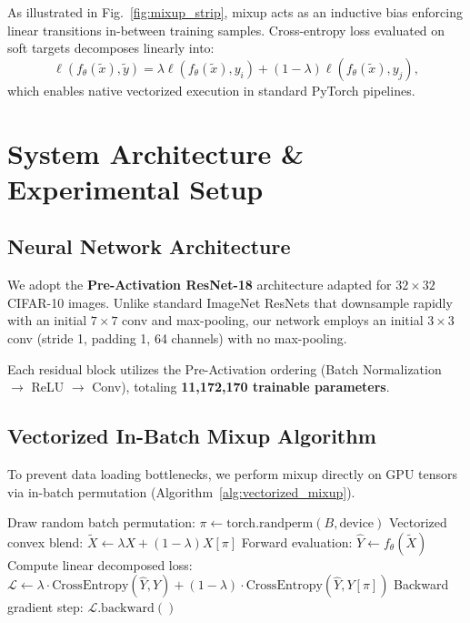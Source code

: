 \documentclass[conference]{IEEEtran}
\begin{document}
As illustrated in Fig.~\ref{fig:mixup_strip}, mixup acts as an inductive bias enforcing linear transitions in-between training samples. Cross-entropy loss evaluated on soft targets decomposes linearly into:
\begin{equation}
\ell(f_\theta(\tilde{x}), \tilde{y}) = \lambda \ell(f_\theta(\tilde{x}), y_i) + (1-\lambda) \ell(f_\theta(\tilde{x}), y_j),
\end{equation}
which enables native vectorized execution in standard PyTorch pipelines.

\section{System Architecture \& Experimental Setup}

\subsection{Neural Network Architecture}
We adopt the \textbf{Pre-Activation ResNet-18} architecture adapted for $32 \times 32$ CIFAR-10 images. Unlike standard ImageNet ResNets that downsample rapidly with an initial $7 \times 7$ conv and max-pooling, our network employs an initial $3 \times 3$ conv (stride 1, padding 1, 64 channels) with no max-pooling. 

Each residual block utilizes the Pre-Activation ordering (Batch Normalization $\to$ ReLU $\to$ Conv), totaling \textbf{11,172,170 trainable parameters}.

\subsection{Vectorized In-Batch Mixup Algorithm}
To prevent data loading bottlenecks, we perform mixup directly on GPU tensors via in-batch permutation (Algorithm~\ref{alg:vectorized_mixup}).

\begin{algorithm}[h]
\SetAlgoLined
{}
\BlankLine
{}
Draw random batch permutation: $\pi \leftarrow \text{torch.randperm}(B, \text{device})$\;
Vectorized convex blend: $\tilde{X} \leftarrow \lambda X + (1 - \lambda) X[\pi]$\;
Forward evaluation: $\hat{Y} \leftarrow f_\theta(\tilde{X})$\;
Compute linear decomposed loss:\;
$\mathcal{L} \leftarrow \lambda \cdot \text{CrossEntropy}(\hat{Y}, Y) + (1 - \lambda) \cdot \text{CrossEntropy}(\hat{Y}, Y[\pi])$\;
Backward gradient step: $\mathcal{L}.\text{backward}()$\;
\;
\caption{Vectorized In-Batch Mixup Pipeline}
\label{alg:vectorized_mixup}
\end{algorithm}
\end{document}
